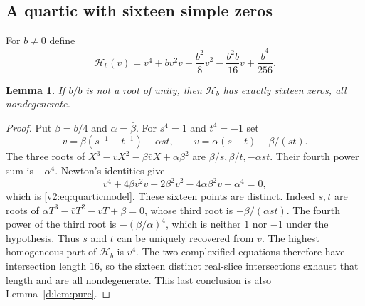 \documentclass[UTF8,11pt]{ctexart}
\newtheorem{lem}[thm]{Lemma}
\theoremstyle{definition}
\numberwithin{equation}{section}
\begin{document}
\subsection{A quartic with sixteen simple zeros}

For $b\ne0$ define
\begin{equation}\label{v2:eq:quarticmodel}
 \mathcal H_b(v)=v^4+bv^2\bar v+\frac{b^2}{8}\bar v^2
               -\frac{b^2\bar b}{16}v+\frac{\bar b^4}{256}.
\end{equation}

\begin{lem}\label{v2:lem:model}
If $b/\bar b$ is not a root of unity, then $\mathcal H_b$ has exactly
sixteen zeros, all nondegenerate.
\end{lem}
\begin{proof}
Put $\beta=b/4$ and $\alpha=\bar\beta$. For $s^4=1$ and $t^4=-1$ set
\[
 v=\beta(s^{-1}+t^{-1})-\alpha st,\qquad
 \bar v=\alpha(s+t)-\beta/(st).
\]
The three roots of
$X^3-vX^2-\beta\bar vX+\alpha\beta^2$ are
$\beta/s,\beta/t,-\alpha st$. Their fourth power sum is
$-\alpha^4$. Newton's identities give
\[
 v^4+4\beta v^2\bar v+2\beta^2\bar v^2
       -4\alpha\beta^2v+\alpha^4=0,
\]
which is \eqref{v2:eq:quarticmodel}.
These sixteen points are distinct. Indeed $s,t$ are roots of
$\alpha T^3-\bar vT^2-vT+\beta=0$, whose third root is
$-\beta/(\alpha st)$. The fourth power of the third root is
$-(\beta/\alpha)^4$, which is neither $1$ nor $-1$ under the hypothesis.
Thus $s$ and $t$ can be uniquely recovered from $v$.
The highest homogeneous part of $\mathcal H_b$ is $v^4$. The two
complexified equations therefore have intersection length $16$, so the
sixteen distinct real-slice intersections exhaust that length and are
all nondegenerate. This last conclusion is also
Lemma~\ref{d:lem:pure}.
\end{proof}
\end{document}
